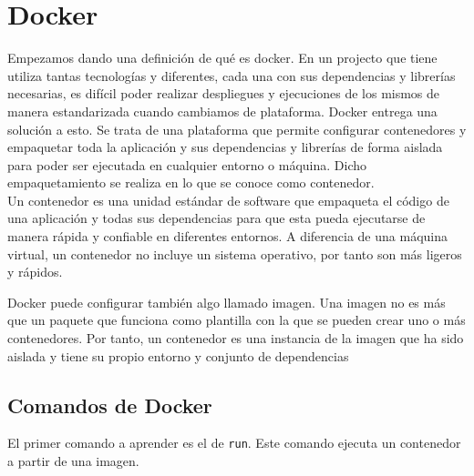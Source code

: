 \chapter{Docker}

Empezamos dando una definición de qué es docker. En un projecto que tiene utiliza tantas tecnologías y diferentes, cada una con sus dependencias y librerías necesarias, es difícil poder realizar despliegues y ejecuciones de los mismos de manera estandarizada cuando cambiamos de plataforma. Docker entrega una solución a esto. Se trata de una plataforma que permite configurar contenedores y empaquetar toda la aplicación y sus dependencias y librerías de forma aislada para poder ser ejecutada en cualquier entorno o máquina. Dicho empaquetamiento se realiza en lo que se conoce como contenedor.  \\

Un contenedor es una unidad estándar de software que empaqueta el código de una aplicación y todas sus dependencias para que esta pueda ejecutarse de manera rápida y confiable en diferentes entornos. A diferencia de una máquina virtual, un contenedor no incluye un sistema operativo, por tanto son más ligeros y rápidos. 

Docker puede configurar también algo llamado imagen. Una imagen no es más que un paquete que funciona como plantilla con la que se pueden crear uno o más contenedores. Por tanto, un contenedor es una instancia de la imagen que ha sido aislada y tiene su propio entorno y conjunto de dependencias

\section{Comandos de Docker}

El primer comando a aprender es el de \texttt{run}. Este comando ejecuta un contenedor a partir de una imagen. 

